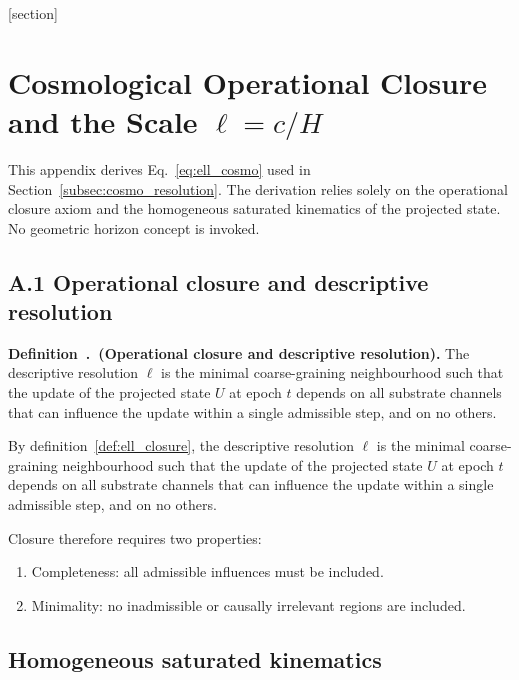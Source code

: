 [section]
\renewcommand{\thedefctr}{\thesection.\arabic{defctr}}

\section{Cosmological Operational Closure and the Scale $\ell = c/H$}
  \label{app:cosmo_resolution}

  This appendix derives Eq.~\eqref{eq:ell_cosmo} used in Section~\ref{subsec:cosmo_resolution}.
  The derivation relies solely on the operational closure axiom and the
  homogeneous saturated kinematics of the projected state.
  No geometric horizon concept is invoked.

  \subsection{A.1 Operational closure and descriptive resolution}
    \label{subsec:operational-closure}

    \label{def:ell_closure}
    \noindent\textbf{Definition~\thedefctr\ (Operational closure and descriptive resolution).}
    The descriptive resolution $\ell$ is the minimal coarse-graining neighbourhood such that the update of the
    projected state $U$ at epoch $t$ depends on all substrate channels that can influence the update within a
    single admissible step, and on no others.
    \par\medskip

    \noindent By definition~\ref{def:ell_closure}, the descriptive resolution $\ell$
    is the minimal coarse-graining neighbourhood such that the update of the
    projected state $U$ at epoch $t$ depends on all substrate channels that can
    influence the update within a single admissible step, and on no others.

    Closure therefore requires two properties:

    \begin{enumerate}
      \item Completeness: all admissible influences must be included.
      \item Minimality: no inadmissible or causally irrelevant regions are included.
    \end{enumerate}

  \subsection{Homogeneous saturated kinematics}
    \label{subsec:homogeneous-saturated-kinematics}

